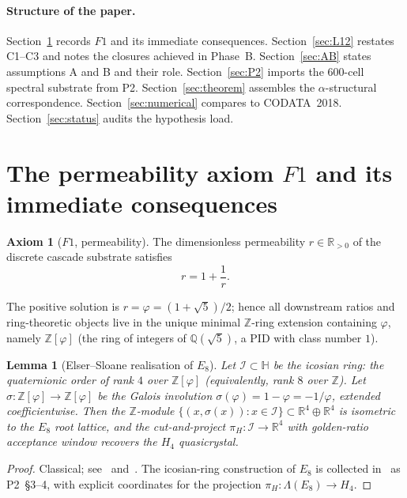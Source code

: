 \documentclass[12pt]{article}
\newtheorem{lemma}[theorem]{Lemma}
\theoremstyle{definition}
\newtheorem{axiom}[theorem]{Axiom}
\theoremstyle{remark}
\newcommand{\R}{\mathbb{R}}
\newcommand{\Q}{\mathbb{Q}}
\newcommand{\Z}{\mathbb{Z}}
\newcommand{\Zphi}{\mathbb{Z}[\varphi]}
\begin{document}
\paragraph{Structure of the paper.} Section~\ref{sec:F1} records $F1$ and its immediate consequences. Section~\ref{sec:L12} restates C1--C3 and notes the closures achieved in Phase~B. Section~\ref{sec:AB} states assumptions A and B and their role. Section~\ref{sec:P2} imports the 600-cell spectral substrate from P2. Section~\ref{sec:theorem} assembles the $\alpha$-structural correspondence. Section~\ref{sec:numerical} compares to CODATA~2018. Section~\ref{sec:status} audits the hypothesis load.

\section{The permeability axiom $F1$ and its immediate consequences}\label{sec:F1}

\begin{axiom}[$F1$, permeability]\label{axiom:F1}
The dimensionless permeability $r \in \R_{>0}$ of the discrete cascade substrate satisfies
\[
  r = 1 + \frac{1}{r}.
\]
\end{axiom}

The positive solution is $r = \varphi = (1 + \sqrt 5)/2$; hence all downstream ratios and ring-theoretic objects live in the unique minimal $\Z$-ring extension containing $\varphi$, namely $\Zphi$ (the ring of integers of $\Q(\sqrt 5)$, a PID with class number $1$).

\begin{lemma}[Elser--Sloane realisation of $E_8$]\label{lem:ES}
Let $\mathcal{I} \subset \mathbb{H}$ be the icosian ring: the quaternionic order of rank $4$ over $\Zphi$ (equivalently, rank $8$ over $\Z$). Let $\sigma: \Zphi \to \Zphi$ be the Galois involution $\sigma(\varphi) = 1 - \varphi = -1/\varphi$, extended coefficientwise. Then the $\Z$-module $\{(x, \sigma(x)) : x \in \mathcal{I}\} \subset \R^4 \oplus \R^4$ is isometric to the $E_8$ root lattice, and the cut-and-project $\pi_H: \mathcal{I} \to \R^4$ with golden-ratio acceptance window recovers the $H_4$ quasicrystal.
\end{lemma}

\begin{proof}
Classical; see~\citep[\S 3]{ElserSloane1987} and~\citep{MoodyPatera1993}. The icosian-ring construction of $E_8$ is collected in~\citep[\S 3--4]{CascadeAlgSubstrate} as P2~\S 3--4, with explicit coordinates for the projection $\pi_H: \Lambda(E_8) \to H_4$.
\end{proof}
\end{document}
